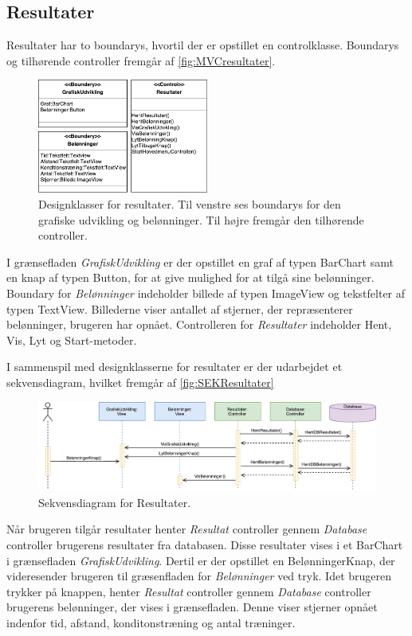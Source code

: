 \subsection*{Resultater}
Resultater har to boundarys, hvortil der er opstillet en controlklasse. Boundarys og tilhørende controller fremgår af \autoref{fig:MVCresultater}. 

\begin{figure} [H]
\centering
\includegraphics[width=0.5\textwidth]{figures/MVC/MVCResultater}
\caption{Designklasser for resultater. Til venstre ses boundarys for den grafiske udvikling og belønninger. Til højre fremgår den tilhørende controller.}
\label{fig:MVCresultater}
\end{figure}

\noindent
I grænsefladen \textit{GrafiskUdvikling} er der opstillet en graf af typen BarChart samt en knap af typen Button, for at give mulighed for at tilgå sine belønninger. Boundary for \textit{Belønninger} indeholder billede af typen ImageView og tekstfelter af typen TextView. Billederne viser antallet af stjerner, der repræsenterer belønninger, brugeren har opnået.
Controlleren for \textit{Resultater} indeholder Hent, Vis, Lyt og Start-metoder. 

I sammenspil med designklasserne for resultater er der udarbejdet et sekvensdiagram, hvilket fremgår af \autoref{fig:SEKResultater}

\begin{figure} [H]
\centering
\includegraphics[width=1\textwidth]{figures/Sek/SEKResultater}
\caption{Sekvensdiagram for Resultater.}
\label{fig:SEKResultater}
\end{figure} 

\noindent 
Når brugeren tilgår resultater henter \textit{Resultat} controller gennem \textit{Database} controller brugerens resultater fra databasen. Disse resultater vises i et BarChart i grænsefladen \textit{GrafiskUdvikling}. Dertil er der opstillet en BelønningerKnap, der videresender brugeren til græsenfladen for \textit{Belønninger} ved tryk. Idet brugeren trykker på knappen, henter \textit{Resultat} controller gennem \textit{Database} controller brugerens belønninger, der vises i grænsefladen. Denne viser stjerner opnået indenfor tid, afstand, konditonstræning og antal træninger.

